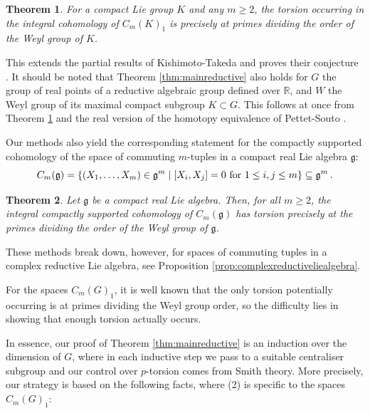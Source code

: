 \documentclass[oneside, 12pt, a4paper]{amsart}
\numberwithin{equation}{section}
\newcommand{\R}{\mathbb{R}}
\theoremstyle{plain}
\newtheorem{theorem}{Theorem}[section]
\theoremstyle{definition}
\theoremstyle{remark}
\begin{document}
\begin{theorem} \label{thm:mainlie}
For a compact Lie group $K$ and any $m\geq 2$, the torsion occurring in the integral cohomology of $C_m(K)_1$ is precisely at primes dividing the order of the Weyl group of $K$.
\end{theorem}



This extends the partial results of Kishimoto-Takeda \cite{KishimotoTakeda1} and proves their conjecture \cite[Conjecture 7.11]{KishimotoTakeda1}. It should be noted that Theorem \ref{thm:mainreductive} also holds for $G$ the group of real points of a reductive algebraic group defined over $\R$, and $W$ the Weyl group of its maximal compact subgroup $K\subset G$. This follows at once from Theorem \ref{thm:mainlie} and the  real version of the homotopy equivalence of Pettet-Souto \cite{PettetSouto}. 


Our methods also yield the corresponding statement for the compactly supported cohomology of the space of commuting $m$-tuples in a compact real Lie algebra $\mathfrak{g}$:
\[C_m(\mathfrak{g})=\{(X_1,\dots,X_m)\in \mathfrak{g}^m\mid [X_i,X_j]=0 \textnormal{ for } 1\leq i,j\leq m\}\subseteq \mathfrak{g}^m\, .\]

\begin{theorem} \label{thm:mainliealgebra}
Let $\mathfrak{g}$ be a compact real Lie algebra. Then, for all $m\geq 2$, the integral compactly supported cohomology of $C_m(\mathfrak{g})$ has torsion precisely at the primes dividing the order of the Weyl group of $\mathfrak{g}$.
\end{theorem}

These methods break down, however, for spaces of commuting tuples in a complex reductive Lie algebra, see Proposition \ref{prop:complexreductiveliealgebra}.

For the spaces $C_m(G)_1$, it is well known that the only torsion potentially occurring is at primes dividing the Weyl group order, so the difficulty lies in showing that enough torsion actually occurs.

In essence, our proof of Theorem \ref{thm:mainreductive} is an induction over the dimension of $G$, where in each inductive step we pass to a suitable centraliser subgroup and our control over $p$-torsion comes from Smith theory. More precisely, our strategy is based on the following facts, where (2) is specific to the spaces $C_m(G)_1$:
\end{document}
